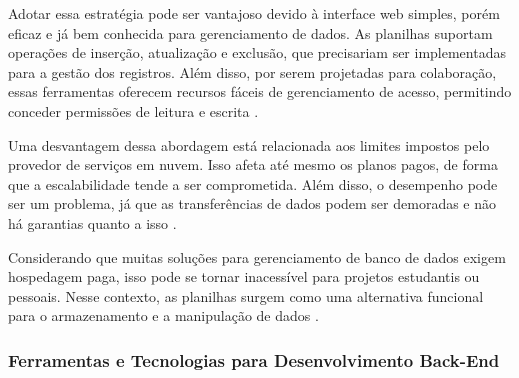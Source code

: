 Adotar essa estratégia pode ser vantajoso devido à interface web simples, porém eficaz e já bem conhecida para gerenciamento de dados. As planilhas suportam operações de inserção, atualização e exclusão, que precisariam ser implementadas para a gestão dos registros. Além disso, por serem projetadas para colaboração, essas ferramentas oferecem recursos fáceis de gerenciamento de acesso, permitindo conceder permissões de leitura e escrita \cite{schwertnercharao:hal-02119998}.

Uma desvantagem dessa abordagem está relacionada aos limites impostos pelo provedor de serviços em nuvem. Isso afeta até mesmo os planos pagos, de forma que a escalabilidade tende a ser comprometida. Além disso, o desempenho pode ser um problema, já que as transferências de dados podem ser demoradas e não há garantias quanto a isso \cite{schwertnercharao:hal-02119998}.

Considerando que muitas soluções para gerenciamento de banco de dados exigem hospedagem paga, isso pode se tornar inacessível para projetos estudantis ou pessoais. Nesse contexto, as planilhas surgem como uma alternativa funcional para o armazenamento e a manipulação de dados \cite{ufsm2024}.

\subsubsection{Ferramentas e Tecnologias para Desenvolvimento Back-End}

